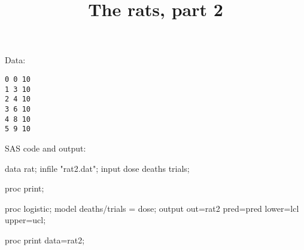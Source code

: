 \documentclass{article}
\title{The rats, part 2}
\begin{document}
\maketitle



Data:


\begin{verbatim}
0 0 10
1 3 10
2 4 10
3 6 10
4 8 10
5 9 10
\end{verbatim}

SAS code and output:

\begin{Winput}
data rat;
  infile "rat2.dat";
  input dose deaths trials;

proc print;

proc logistic;
  model deaths/trials = dose;
  output out=rat2 pred=pred lower=lcl upper=ucl;

proc print data=rat2;
\end{Winput}
\end{document}
